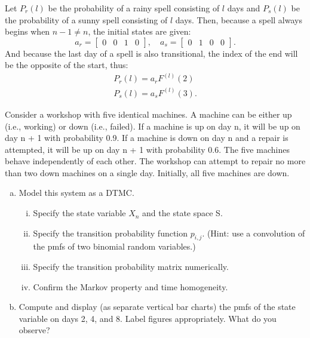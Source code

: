 \documentclass[answers]{exam}
\begin{document}
\begin{questions}
\begin{solution}
	Let \(P_r(l)\) be the probability of a rainy spell consisting of \(l\) days and
	\(P_s(l)\) be the probability of a sunny spell consisting of \(l\) days.
	Then, because a spell always begins when \(n-1\neq n\), the initial states are given:
	\[
	a_r = \begin{bmatrix} 0 & 0 & 1 & 0 \end{bmatrix}, \quad
	a_s = \begin{bmatrix} 0 & 1 & 0 & 0 \end{bmatrix}.
	\]
	And because the last day of a spell is also transitional,
	the index of the end will be the opposite of the start, thus:	
	\begin{align*}
	P_r(l) = a_rF^{(l)}(2) \\
	P_s(l) = a_sF^{(l)}(3).
	\end{align*}
	
	
\end{solution}

\question 
Consider a workshop with five identical machines. 
A machine can be either up (i.e., working) or down (i.e., failed). If a machine is up on day n, it will be up on day n + 1 with probability 0.9. If a machine is down on day n and a repair is attempted, it will be up on day n + 1 with probability 0.6. The five machines behave independently of each other. The workshop can attempt to repair no more than two down machines on a single day. Initially, all five machines are down.

\begin{enumerate}[(a)]
	\item Model this system as a DTMC.
	\begin{enumerate}[i.]
		\item Specify the state variable \(X_n\) and the state space S.
		\item Specify the transition probability function \(p_{i,j}\). (Hint: use a convolution of the pmfs of two binomial random variables.)
		\item Specify the transition probability matrix numerically.
		\item Confirm the Markov property and time homogeneity.
	\end{enumerate}
	\item  Compute and display (as separate vertical bar charts) the pmfs of the state variable on days 2, 4, and 8. 
	Label figures appropriately. What do you observe?
	

\end{enumerate}
\end{questions}
\end{document}
